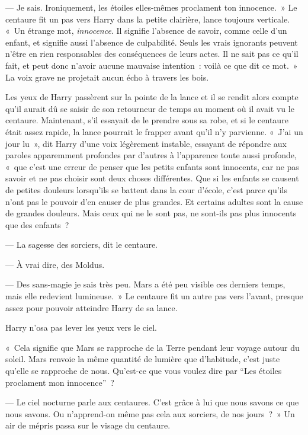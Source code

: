 --- Je sais.
Ironiquement, les étoiles elles-mêmes proclament ton innocence.~»
Le centaure fit un pas vers Harry dans la petite clairière, lance toujours verticale.
«~Un étrange mot, \emph{innocence}.
Il signifie l'absence de savoir, comme celle d'un enfant, et signifie aussi l'absence de culpabilité.
Seuls les vrais ignorants peuvent n'être en rien responsables des conséquences de leurs actes.
Il ne sait pas ce qu'il fait, et peut donc n'avoir aucune mauvaise intention~: voilà ce que dit ce mot.~»
La voix grave ne projetait aucun écho à travers les bois.

Les yeux de Harry passèrent sur la pointe de la lance et il se rendit alors compte qu'il aurait dû se saisir de son retourneur de temps au moment où il avait vu le centaure.
Maintenant, s'il essayait de le prendre sous sa robe, et si le centaure était assez rapide, la lance pourrait le frapper avant qu'il n'y parvienne.
«~J'ai un jour lu~», dit Harry d'une voix légèrement instable, essayant de répondre aux paroles apparemment profondes par d'autres à l'apparence toute aussi profonde, «~que c'est une erreur de penser que les petits enfants sont innocents, car ne pas savoir et ne pas choisir sont deux choses différentes.
Que si les enfants se causent de petites douleurs lorsqu'ils se battent dans la cour d'école, c'est parce qu'ils n'ont pas le pouvoir d'en causer de plus grandes.
Et certains adultes sont la cause de grandes douleurs.
Mais ceux qui ne le sont pas, ne sont-ils pas plus innocents que des enfants~?

--- La sagesse des sorciers, dit le centaure.

--- À vrai dire, des Moldus.

--- Des sans-magie je sais très peu.
Mars a été peu visible ces derniers temps, mais elle redevient lumineuse.~»
Le centaure fit un autre pas vers l'avant, presque assez pour pouvoir atteindre Harry de sa lance.

Harry n'osa pas lever les yeux vers le ciel.

«~Cela signifie que Mars se rapproche de la Terre pendant leur voyage autour du soleil.
Mars renvoie la même quantité de lumière que d'habitude, c'est juste qu'elle se rapproche de nous.
Qu'est-ce que vous voulez dire par “Les étoiles proclament mon innocence”~?

--- Le ciel nocturne parle aux centaures.
C'est grâce à lui que nous savons ce que nous savons.
Ou n'apprend-on même pas cela aux sorciers, de nos jours~?~»
Un air de mépris passa sur le visage du centaure.


